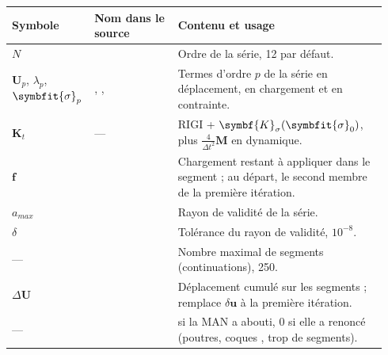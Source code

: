 \documentclass[11pt,a4paper]{article}
\makeatletter
\numberwithin{equation}{section}
\newcommand{\src}[1]{\texttt{\detokenize{#1}}}          %
\newcommand{\op}[1]{\textsf{\small #1}}                 %
\newcommand{\vc}[1]{\symbf{#1}}                         %
\newcommand{\sig}{\symbfit{\sigma}}
\newenvironment{glossaire}[1][Glossaire]{%
  \par\smallskip\needspace{7\baselineskip}\noindent{\sffamily\bfseries\small #1}\par\nopagebreak
  \small
  \renewcommand{\arraystretch}{1.18}
  \begin{longtable}{@{}>{\raggedright\arraybackslash}p{0.17\linewidth}
                     >{\raggedright\arraybackslash}p{0.22\linewidth}
                     >{\raggedright\arraybackslash}p{0.555\linewidth}@{}}
  \toprule
  \textbf{Symbole} & \textbf{Nom dans le source} & \textbf{Contenu et usage}\\
  \midrule\endhead
  \bottomrule\endfoot}
  {\end{longtable}\addtocounter{table}{-1}\normalsize\vspace{-0.4em}}
\makeatother
\begin{document}
\begin{glossaire}
$N$ & \src{ORDRE} & Ordre de la série, 12 par défaut.\\
$\vc U_p$, $\lambda_p$, $\sig_p$ & \src{tadep.p}, \src{talam.p}, \src{tasig.p} & Termes d'ordre $p$ de la série en déplacement, en chargement et en contrainte.\\
$\vc K_t$ & — & \op{RIGI} + $\vc K_\sigma(\sig_0)$, plus $\tfrac4{\Delta t^2}\vc M$ en dynamique.\\
$\vc f$ & \src{ff} & Chargement restant à appliquer dans le segment ; au départ, le second membre de la première itération.\\
$a_{max}$ & \src{aserie} & Rayon de validité de la série.\\
$\delta$ & \src{prec} & Tolérance du rayon de validité, $10^{-8}$.\\
— & \src{ncontmax} & Nombre maximal de segments (continuations), 250.\\
$\Delta\vc U$ & \src{deltatot} & Déplacement cumulé sur les segments ; remplace $\delta\vc u$ à la première itération.\\
— & \src{IOUT} & 1 si la MAN a abouti, 0 si elle a renoncé (poutres, coques \src{COQ2}, trop de segments).\\
\end{glossaire}
\end{document}
